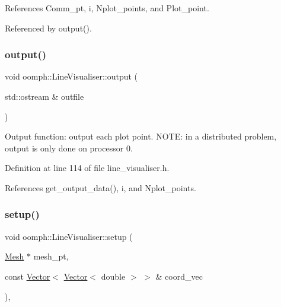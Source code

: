 References Comm\+\_\+pt, i, Nplot\+\_\+points, and Plot\+\_\+point.



Referenced by output().

\mbox{\label{classoomph_1_1LineVisualiser_adafda17eaa1c034ff7236e1f7dcbc771}} 
\subsubsection{\texorpdfstring{output()}{output()}}
{\footnotesize\ttfamily void oomph\+::\+Line\+Visualiser\+::output (\begin{DoxyParamCaption}\item[{std\+::ostream \&}]{outfile }\end{DoxyParamCaption})\hspace{0.3cm}{\ttfamily [inline]}}



Output function\+: output each plot point. N\+O\+TE\+: in a distributed problem, output is only done on processor 0. 



Definition at line 114 of file line\+\_\+visualiser.\+h.



References get\+\_\+output\+\_\+data(), i, and Nplot\+\_\+points.

\mbox{\label{classoomph_1_1LineVisualiser_a8989cffc2b0ed7c32d9bd8a02c170de4}} 
\subsubsection{\texorpdfstring{setup()}{setup()}}
{\footnotesize\ttfamily void oomph\+::\+Line\+Visualiser\+::setup (\begin{DoxyParamCaption}\item[{\hyperlink{classoomph_1_1Mesh}{Mesh} $\ast$}]{mesh\+\_\+pt,  }\item[{const \hyperlink{classoomph_1_1Vector}{Vector}$<$ \hyperlink{classoomph_1_1Vector}{Vector}$<$ double $>$ $>$ \&}]{coord\+\_\+vec }\end{DoxyParamCaption})\hspace{0.3cm}{\ttfamily [inline]}, {\ttfamily [private]}}



